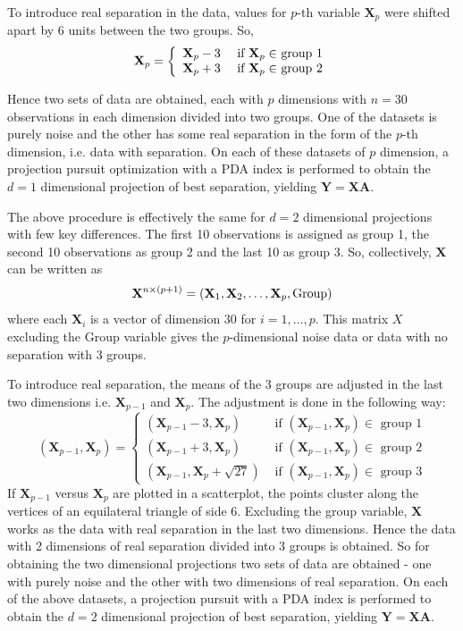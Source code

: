 To introduce real separation in the data, values for $p$-th variable $\mathbf{X}_p$ were shifted apart by 6 units between the two groups. So, 
$$
\mathbf{X}_p = \left\{ \begin{array}{rl}
 \mathbf{X}_p - 3 &\mbox{ if $ \mathbf{X}_p \in$ group 1} \\
 \mathbf{X}_p + 3 &\mbox{ if $ \mathbf{X}_p \in$ group 2}
       \end{array} \right.
$$

Hence two sets of data are obtained, each with $p$ dimensions with $n = 30$ observations in each dimension divided into two groups. One of the datasets is purely noise and the other has some real separation in the form of the $p$-th dimension, i.e. data with separation. On each of these datasets of $p$ dimension, a projection pursuit optimization with a PDA index is performed to obtain the $d = 1$ dimensional projection of best separation, yielding $\mathbf{Y = XA}$.  

The above procedure is effectively the same for $d = 2$ dimensional projections with few key differences. The first 10 observations is assigned as group 1, the second 10 observations as group 2 and the last 10 as group 3.  So, collectively,  $\mathbf{X}$ can be written as
$$ \mathbf{X}^{n \times (p + 1)} = ( \mathbf{X}_1,  \mathbf{X}_2, \dots, \mathbf{X}_p, \hbox{Group})$$ where each $ \mathbf{X}_i$ is a vector of dimension 30 for $i = 1, \dots, p$. This matrix $X$ excluding the Group variable gives the $p$-dimensional noise data or data with no separation with 3 groups.

To introduce real separation, the means of the 3 groups are adjusted in the last two dimensions i.e. $ \mathbf{X}_{p-1}$ and $ \mathbf{X}_p$. The adjustment is done in the following way:
$$
( \mathbf{X}_{p-1},  \mathbf{X}_p) = \left\{ \begin{array}{rl}
 ( \mathbf{X}_{p-1} - 3,  \mathbf{X}_p) &\mbox{ if $( \mathbf{X}_{p-1},  \mathbf{X}_p) \in$ group 1} \\
 ( \mathbf{X}_{p-1} + 3,  \mathbf{X}_p) &\mbox{ if $( \mathbf{X}_{p-1},  \mathbf{X}_p) \in$ group 2} \\
 ( \mathbf{X}_{p-1} ,  \mathbf{X}_p + \sqrt{27}) &\mbox{ if $( \mathbf{X}_{p-1},  \mathbf{X}_p) \in$ group 3}
       \end{array} \right.
$$
If $ \mathbf{X}_{p-1}$ versus $ \mathbf{X}_p$ are plotted in a scatterplot, the points cluster along the vertices of an equilateral triangle of side 6. Excluding the group variable, $ \mathbf{X}$ works as the data with real separation in the last two dimensions. Hence the data with 2 dimensions of real separation divided into 3 groups is obtained.  So for obtaining the two dimensional projections two sets of data are obtained - one with purely noise and the other with two dimensions of real separation. On each of the above datasets, a projection pursuit with a PDA index is performed to obtain the $d = 2$ dimensional projection of best separation, yielding $\mathbf{Y = XA}$. 

